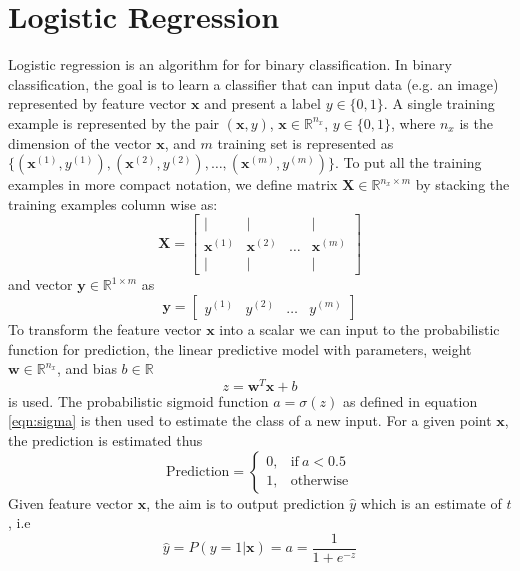 \documentclass[12pt]{report}
\numberwithin{equation}{section}
\begin{document}
\section{Logistic Regression}
Logistic regression is an algorithm for for binary classification. In binary classification, the goal is to learn a classifier that can input data (e.g. an image) represented by feature vector $\bm{x}$ and present a label $y \in \{0,1\}$.  A single training example is represented by the pair $(\bm{x}, y)$, $\bm{x} \in \mathbb{R}^{n_x}$, $y \in \{0,1\}$, where $n_x$ is the dimension of the vector $\bm{x}$, and $m$ training set is represented as $\{(\bm{x}^{(1)},y^{(1)}), (\bm{x}^{(2)},y^{(2)}), \hdots, (\bm{x}^{(m)},y^{(m)})\}$. To put all the training examples in more compact notation, we define matrix $\bm{X}\in\mathbb{R}^{n_x\times m}$ by stacking the training examples column wise as:
\begin{equation}\label{eqn:train1}
\bm{X} = \left[\begin{array}{cccc}
		 | & | &  & | \\
		 \bm{x}^{(1)} & \bm{x}^{(2)} & \hdots & \bm{x}^{(m)} \\
		 | & | &  & |
		 \end{array}\right]
\end{equation}
and vector $\bm{y}\in \mathbb{R}^{1\times m}$ as 
\begin{equation}\label{eqn:train2}
\bm{y} = \left[\begin{array}{cccc}
		 y^{(1)} & y^{(2)} & \hdots & y^{(m)} 
		 \end{array}\right]
\end{equation}
To transform the feature vector $\bm{x}$ into a scalar we can input to the probabilistic function for prediction, the linear predictive model with parameters, weight $\bm{w}\in \mathbb{R}^{n_x}$, and bias $b\in\mathbb{R}$
\begin{equation}\label{eqn:linear}
z = \bm{w}^T\bm{x} + b
\end{equation}
is used. The probabilistic sigmoid function $a=\sigma(z)$ as defined in equation \eqref{eqn:sigma} is then used to estimate the class of a new input. For a given point $\bm{x}$, the prediction is estimated thus
\begin{equation} \label{eq:inference}
\text{Prediction} = \left\{
	\begin{array}{ll}
	0, & \text{if}\  a < 0.5 \\
    1, & \text{otherwise}
	\end{array} \right.
\end{equation}
Given feature vector $\bm{x}$, the aim is to output prediction $\hat{y}$ which is an estimate of $t$, i.e 
\begin{equation}\label{eqn:t}
\hat{y} = P(y=1|\bm{x}) = a = \frac{1}{1+e^{-z}}
\end{equation}
\end{document}
